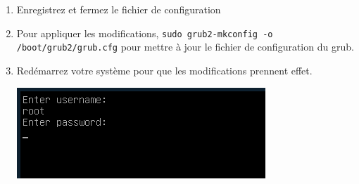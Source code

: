\documentclass[12pt,a4paper]{article}
\newcommand{\code}[1]{\colorbox{light-gray}{\texttt{#1}}}
\begin{document}
\begin{enumerate}
\begin{lstlisting}
            \end{lstlisting}
            \item Enregistrez et fermez le fichier de configuration
            \item Pour appliquer les modifications, \code{sudo grub2-mkconfig -o /boot/grub2/grub.cfg} pour mettre à jour le fichier de configuration du grub.
            \item Redémarrez votre système pour que les modifications prennent effet.
            \begin{center}
                \includegraphics{passwordrequired}
            \end{center}
        \end{enumerate}
        
        \newpage
\end{document}
